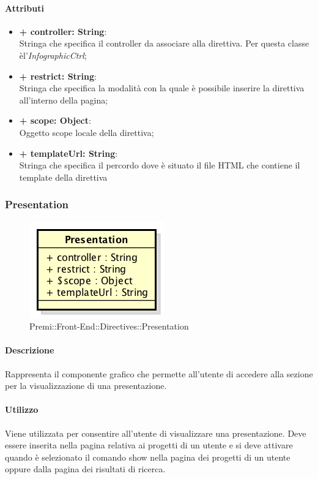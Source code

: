 	\paragraph{Attributi}
	\begin{itemize}
		\item \textbf{+ controller: String}:\\
			Stringa che specifica il controller da associare alla direttiva. Per questa classe èl'\textit{InfographicCtrl};
		\item \textbf{+ restrict: String}:\\
			Stringa che specifica la modalità con la quale è possibile inserire la direttiva all'interno della pagina;
		\item \textbf{+ scope: Object}:\\
			Oggetto scope locale della direttiva;
		\item \textbf{+ templateUrl: String}:\\
			Stringa che specifica il percordo dove è situato il file \gls{HTML} che contiene il \gls{template} della direttiva
	\end{itemize}
\newpage	
	

\subsubsection{Presentation}
	\begin{figure}[h]
		\centering
		\includegraphics[width=0.4\linewidth]{img/premi_front_end_directives_presentation}
		\caption[Premi::Front-End::Directives::Presentation]{Premi::Front-End::Directives::Presentation}
	\end{figure}
	
	\paragraph{Descrizione}
	Rappresenta il componente grafico che permette all'utente di accedere alla sezione per la visualizzazione di una presentazione.
	
	\paragraph{Utilizzo}
	Viene utilizzata per consentire all'utente di visualizzare una presentazione. Deve essere inserita nella pagina relativa ai progetti di un utente e si deve attivare quando è selezionato il comando show nella pagina dei progetti di un utente oppure dalla pagina dei risultati di ricerca.
	
